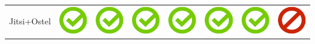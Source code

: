 \documentclass[10pt,foldmark,tumble]{leaflet}
\begin{document}
{{\begin{tabular}{ L{2cm} | C{2cm} | C{2cm} | C{2cm} | C{2cm} | C{2cm} | C{2cm} | C{2cm} | }
Jitsi+Ostel  & \includegraphics[scale=0.1]{pics/haken.png} & \includegraphics[scale=0.1]{pics/haken.png} & \includegraphics[scale=0.1]{pics/haken.png} & \includegraphics[scale=0.1]{pics/haken.png} & \includegraphics[scale=0.1]{pics/haken.png} & \includegraphics[scale=0.1]{pics/haken.png} & \includegraphics[scale=0.1]{pics/nohaken.png} \tabularnewline

\end{tabular}}}
\end{document}
